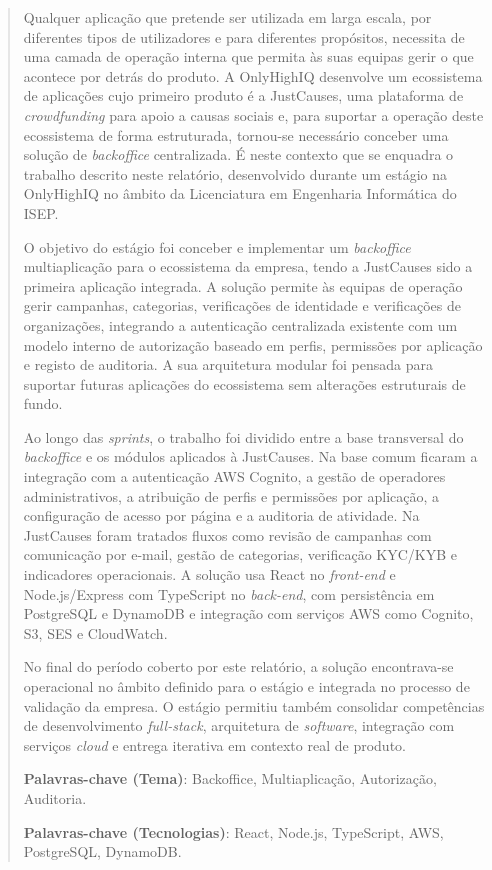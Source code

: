 \begin{abstract}

Qualquer aplicação que pretende ser utilizada em larga escala, por diferentes tipos de utilizadores e para diferentes propósitos, necessita de uma camada de operação interna que permita às suas equipas gerir o que acontece por detrás do produto. A OnlyHighIQ desenvolve um ecossistema de aplicações cujo primeiro produto é a JustCauses, uma plataforma de \textit{crowdfunding} para apoio a causas sociais e, para suportar a operação deste ecossistema de forma estruturada, tornou-se necessário conceber uma solução de \textit{backoffice} centralizada. É neste contexto que se enquadra o trabalho descrito neste relatório, desenvolvido durante um estágio na OnlyHighIQ no âmbito da Licenciatura em Engenharia Informática do ISEP.

O objetivo do estágio foi conceber e implementar um \textit{backoffice} multiaplicação para o ecossistema da empresa, tendo a JustCauses sido a primeira aplicação integrada. A solução permite às equipas de operação gerir campanhas, categorias, verificações de identidade e verificações de organizações, integrando a autenticação centralizada existente com um modelo interno de autorização baseado em perfis, permissões por aplicação e registo de auditoria. A sua arquitetura modular foi pensada para suportar futuras aplicações do ecossistema sem alterações estruturais de fundo.

Ao longo das \textit{sprints}, o trabalho foi dividido entre a base transversal do \textit{backoffice} e os módulos aplicados à JustCauses. Na base comum ficaram a integração com a autenticação AWS Cognito, a gestão de operadores administrativos, a atribuição de perfis e permissões por aplicação, a configuração de acesso por página e a auditoria de atividade. Na JustCauses foram tratados fluxos como revisão de campanhas com comunicação por e-mail, gestão de categorias, verificação \gls{KYC}/\gls{KYB} e indicadores operacionais. A solução usa React no \textit{front-end} e Node.js/Express com TypeScript no \textit{back-end}, com persistência em PostgreSQL e DynamoDB e integração com serviços AWS como Cognito, S3, SES e CloudWatch.

No final do período coberto por este relatório, a solução encontrava-se operacional no âmbito definido para o estágio e integrada no processo de validação da empresa. O estágio permitiu também consolidar competências de desenvolvimento \textit{full-stack}, arquitetura de \textit{software}, integração com serviços \textit{cloud} e entrega iterativa em contexto real de produto.

\vspace{20mm}

\textbf{Palavras-chave (Tema)}: Backoffice, Multiaplicação, Autorização, Auditoria.

\textbf{Palavras-chave (Tecnologias)}: React, Node.js, TypeScript, AWS, PostgreSQL, DynamoDB.

\end{abstract}


